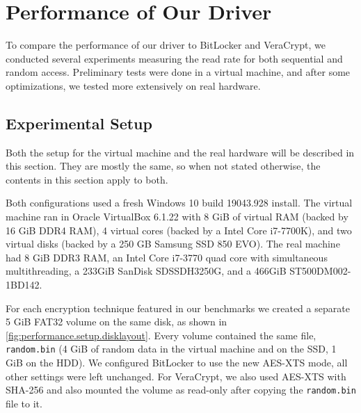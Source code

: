 \chapter{Performance of Our Driver}
\label{chap:performance}

To compare the performance of our driver to BitLocker and VeraCrypt, we conducted several experiments measuring the read rate for both sequential and random access. Preliminary tests were done in a virtual machine, and after some optimizations, we tested more extensively on real hardware.

\section{Experimental Setup}
\label{chap:performance.setup}
Both the setup for the virtual machine and the real hardware will be described in this section. They are mostly the same, so when not stated otherwise, the contents in this section apply to both.

Both configurations used a fresh Windows 10 build 19043.928 install. The virtual machine ran in Oracle VirtualBox 6.1.22 with 8 GiB of virtual RAM (backed by 16 GiB DDR4 RAM), 4 virtual cores (backed by a Intel Core i7-7700K), and two virtual disks (backed by a 250 GB Samsung SSD 850 EVO). The real machine had 8 GiB DDR3 RAM, an Intel Core i7-3770 quad core with simultaneous multithreading, a 233GiB SanDisk SDSSDH3250G, and a 466GiB ST500DM002-1BD142.

For each encryption technique featured in our benchmarks we created a separate 5 GiB FAT32 volume on the same disk, as shown in \autoref{fig:performance.setup.disklayout}. Every volume contained the same file, \texttt{random.bin} (4 GiB of random data in the virtual machine and on the SSD, 1 GiB on the HDD). We configured BitLocker to use the new AES-XTS mode, all other settings were left unchanged. For VeraCrypt, we also used AES-XTS with SHA-256 and also mounted the volume as read-only after copying the \texttt{random.bin} file to it.

